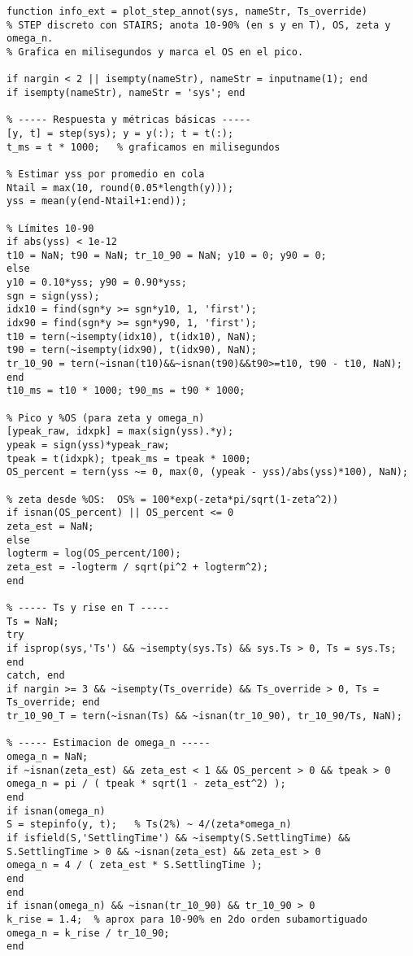 \begin{lstlisting}[style=matlabstyle,caption={Funciones reutilizadas de laboratorios pasados.},label={matlab:oldfunc}]
function info_ext = plot_step_annot(sys, nameStr, Ts_override)
% STEP discreto con STAIRS; anota 10-90% (en s y en T), OS, zeta y omega_n.
% Grafica en milisegundos y marca el OS en el pico.

if nargin < 2 || isempty(nameStr), nameStr = inputname(1); end
if isempty(nameStr), nameStr = 'sys'; end

% ----- Respuesta y métricas básicas -----
[y, t] = step(sys); y = y(:); t = t(:);
t_ms = t * 1000;   % graficamos en milisegundos

% Estimar yss por promedio en cola
Ntail = max(10, round(0.05*length(y)));
yss = mean(y(end-Ntail+1:end));

% Límites 10-90
if abs(yss) < 1e-12
t10 = NaN; t90 = NaN; tr_10_90 = NaN; y10 = 0; y90 = 0;
else
y10 = 0.10*yss; y90 = 0.90*yss;
sgn = sign(yss);
idx10 = find(sgn*y >= sgn*y10, 1, 'first');
idx90 = find(sgn*y >= sgn*y90, 1, 'first');
t10 = tern(~isempty(idx10), t(idx10), NaN);
t90 = tern(~isempty(idx90), t(idx90), NaN);
tr_10_90 = tern(~isnan(t10)&&~isnan(t90)&&t90>=t10, t90 - t10, NaN);
end
t10_ms = t10 * 1000; t90_ms = t90 * 1000;

% Pico y %OS (para zeta y omega_n)
[ypeak_raw, idxpk] = max(sign(yss).*y);
ypeak = sign(yss)*ypeak_raw;
tpeak = t(idxpk); tpeak_ms = tpeak * 1000;
OS_percent = tern(yss ~= 0, max(0, (ypeak - yss)/abs(yss)*100), NaN);

% zeta desde %OS:  OS% = 100*exp(-zeta*pi/sqrt(1-zeta^2))
if isnan(OS_percent) || OS_percent <= 0
zeta_est = NaN;
else
logterm = log(OS_percent/100);
zeta_est = -logterm / sqrt(pi^2 + logterm^2);
end

% ----- Ts y rise en T -----
Ts = NaN;
try
if isprop(sys,'Ts') && ~isempty(sys.Ts) && sys.Ts > 0, Ts = sys.Ts; end
catch, end
if nargin >= 3 && ~isempty(Ts_override) && Ts_override > 0, Ts = Ts_override; end
tr_10_90_T = tern(~isnan(Ts) && ~isnan(tr_10_90), tr_10_90/Ts, NaN);

% ----- Estimacion de omega_n -----
omega_n = NaN;
if ~isnan(zeta_est) && zeta_est < 1 && OS_percent > 0 && tpeak > 0
omega_n = pi / ( tpeak * sqrt(1 - zeta_est^2) );
end
if isnan(omega_n)
S = stepinfo(y, t);   % Ts(2%) ~ 4/(zeta*omega_n)
if isfield(S,'SettlingTime') && ~isempty(S.SettlingTime) && S.SettlingTime > 0 && ~isnan(zeta_est) && zeta_est > 0
omega_n = 4 / ( zeta_est * S.SettlingTime );
end
end
if isnan(omega_n) && ~isnan(tr_10_90) && tr_10_90 > 0
k_rise = 1.4;  % aprox para 10-90% en 2do orden subamortiguado
omega_n = k_rise / tr_10_90;
end


\end{lstlisting}
